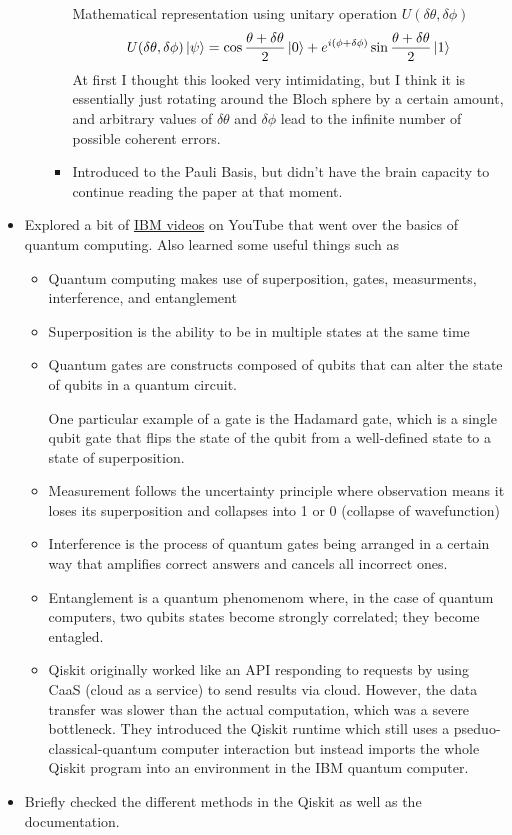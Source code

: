 \documentclass{article}
\begin{document}
\begin{itemize}
\begin{itemize}
\begin{itemize}
            Mathematical representation using unitary operation $U(\delta\theta, \delta\phi)$
            $$U(\delta\theta, \delta\phi)\left| \psi \right> = \cos{\frac {\theta + \delta\theta}{2}}\left| 0 \right> + e^{i(\phi + \delta\phi)}\sin{\frac {\theta + \delta\theta}{2}}\left| 1 \right>$$
            At first I thought this looked very intimidating, but I think it is essentially just rotating around the Bloch sphere by a certain amount, and arbitrary values of $\delta\theta$ and $\delta\phi$ lead to the infinite number of possible coherent errors.
            \item Introduced to the Pauli Basis, but didn't have the brain capacity to continue reading the paper at that moment. 
        \end{itemize}
    \end{itemize}
    \item Explored a bit of \href{https://www.youtube.com/playlist?list=PLOspHqNVtKADPNAxbcP2u6CPzD1g_bBhe}{IBM videos} on YouTube that went over the basics of quantum computing. Also learned some useful things such as
    \begin{itemize}
        \item Quantum computing makes use of superposition, gates, measurments, interference, and entanglement
        \item Superposition is the ability to be in multiple states at the same time
        \item Quantum gates are constructs composed of qubits that can alter the state of qubits in a quantum circuit.
        
        One particular example of a gate is the Hadamard gate, which is a single qubit gate that flips the state of the qubit from a well-defined state to a state of superposition.
        \item Measurement follows the uncertainty principle where observation means it loses its superposition and collapses into 1 or 0 (collapse of wavefunction)
        \item Interference is the process of quantum gates being arranged in a certain way that amplifies correct answers and cancels all incorrect ones. 
        \item Entanglement is a quantum phenomenom where, in the case of quantum computers, two qubits states become strongly correlated; they become entagled. 
        \item Qiskit originally worked like an API responding to requests by using CaaS (cloud as a service) to send results via cloud. However, the data transfer was slower than the actual computation, which was a severe bottleneck. They introduced the Qiskit runtime which still uses a pseduo-classical-quantum computer interaction but instead imports the whole Qiskit program into an environment in the IBM quantum computer.
    \end{itemize}
    \item Briefly checked the different methods in the Qiskit as well as the documentation.
\end{itemize}
\end{document}
